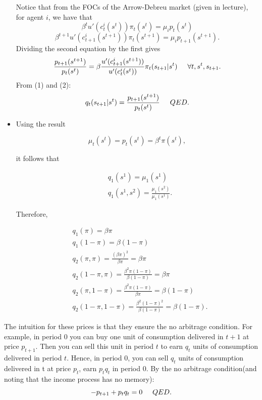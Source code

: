 \documentclass[12pt,a4paper]{article}
\begin{document}
\begin{itemize}
Notice that from the FOCs of the Arrow-Debreu market (given in lecture), for agent $i$, we have that
\begin{equation*}
     \beta^t u'(c_{t}^{i}(s^t))\pi_t(s^t)=\mu_i p_t(s^t)
\end{equation*}
\begin{equation*}
     \beta^{t+1} u'(c_{t+1}^{i}(s^{t+1}))\pi_t(s^{t+1})=\mu_i p_{t+1}(s^{t+1}).
\end{equation*}
Dividing the second equation by the first gives
\begin{equation}
    \frac{p_{t+1}(s^{t+1})}{p_t(s^t)}=\beta\frac{u'(c_{t+1}^{i}(s^{t+1}))}{u'(c_{t}^{i}(s^t))}\pi_t(s_{t+1}|s^{t}) \hspace{5mm} \forall t, s^t, s_{t+1}.
\end{equation}
From (1) and (2):
\begin{equation*}
   q_t(s_{t+1}|s^{t}) =\frac{p_{t+1}(s^{t+1})}{p_t(s^t)} \hspace{5mm} QED.
\end{equation*}

\item Using the result

  $$
    \mu_t(s^t) = p_t(s^t) = \beta^t \pi(s^t),
  $$

  it follows that

  \begin{align*}
    & q_1(s^1) = \mu_1(s^1) \\
    & q_1(s^1,s^2) = \frac{\mu_1(s^2)}{\mu_1(s^1)}.
  \end{align*}

  Therefore,

  \begin{align*}
    & q_1(\pi) = \beta \pi \\
    & q_1(1 - \pi) = \beta (1 - \pi) \\
    & q_2(\pi, \pi) = \frac{(\beta\pi)^2}{\beta \pi} = \beta \pi \\
    & q_2(1 - \pi, \pi) = \frac{\beta^2\pi(1-\pi)}{\beta (1 - \pi)} = \beta \pi \\
    & q_2(\pi, 1 - \pi) = \frac{\beta^2\pi(1-\pi)}{\beta \pi} = \beta ( 1 - \pi) \\
    & q_2(1 - \pi, 1 - \pi) = \frac{\beta^2(1-\pi)^2}{\beta (1 - \pi)} = \beta (1 - \pi).
  \end{align*}

\end{itemize}

The intuition for these prices is that they ensure the no arbitrage condition. For example, in period 0 you can buy one unit of consumption delivered in $t+1$ at price $p_{t+1}$. Then you can sell this unit in period $t$ to earn $q_{t}$ units of consumption delivered in period $t$. Hence, in period 0, you can sell $q_t$ units of consumption delivered in t at price $p_t$, earn $p_{t}q_{t}$ in period 0. By the no arbitrage condition(and noting that the income process has no memory):
\begin{equation*}
    -p_{t+1}+p_tq_t=0 \hspace{5mm} QED.
\end{equation*}
\end{document}
